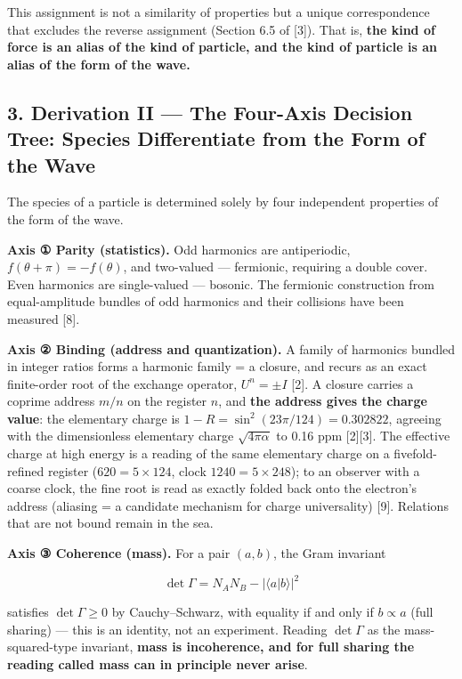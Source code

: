 \documentclass[
  a4paper,
]{article}
\begin{document}
This assignment is not a similarity of properties but a unique
correspondence that excludes the reverse assignment (Section 6.5 of
{[}3{]}). That is, \textbf{the kind of force is an alias of the kind of
particle, and the kind of particle is an alias of the form of the wave.}

\subsection{3. Derivation II --- The Four-Axis Decision Tree: Species
Differentiate from the Form of the
Wave}\label{derivation-ii-the-four-axis-decision-tree-species-differentiate-from-the-form-of-the-wave}

The species of a particle is determined solely by four independent
properties of the form of the wave.

\textbf{Axis ① Parity (statistics).} Odd harmonics are antiperiodic,
\(f(\theta+\pi)=-f(\theta)\), and two-valued --- fermionic, requiring a
double cover. Even harmonics are single-valued --- bosonic. The
fermionic construction from equal-amplitude bundles of odd harmonics and
their collisions have been measured {[}8{]}.

\textbf{Axis ② Binding (address and quantization).} A family of
harmonics bundled in integer ratios forms a harmonic family = a closure,
and recurs as an exact finite-order root of the exchange operator,
\(U^n=\pm I\) {[}2{]}. A closure carries a coprime address \(m/n\) on
the register \(n\), and \textbf{the address gives the charge value}: the
elementary charge is \(1-R=\sin^2(23\pi/124)=0.302822\), agreeing with
the dimensionless elementary charge \(\sqrt{4\pi\alpha}\) to 0.16 ppm
{[}2{]}{[}3{]}. The effective charge at high energy is a reading of the
same elementary charge on a fivefold-refined register
(\(620=5\times124\), clock \(1240=5\times248\)); to an observer with a
coarse clock, the fine root is read as exactly folded back onto the
electron's address (aliasing = a candidate mechanism for charge
universality) {[}9{]}. Relations that are not bound remain in the sea.

\textbf{Axis ③ Coherence (mass).} For a pair \((a,b)\), the Gram
invariant

\[
\det\Gamma=N_AN_B-|\langle a|b\rangle|^2
\]

satisfies \(\det\Gamma\ge0\) by Cauchy--Schwarz, with equality if and
only if \(b\propto a\) (full sharing) --- this is an identity, not an
experiment. Reading \(\det\Gamma\) as the mass-squared-type invariant,
\textbf{mass is incoherence, and for full sharing the reading called
mass can in principle never arise}.
\end{document}
